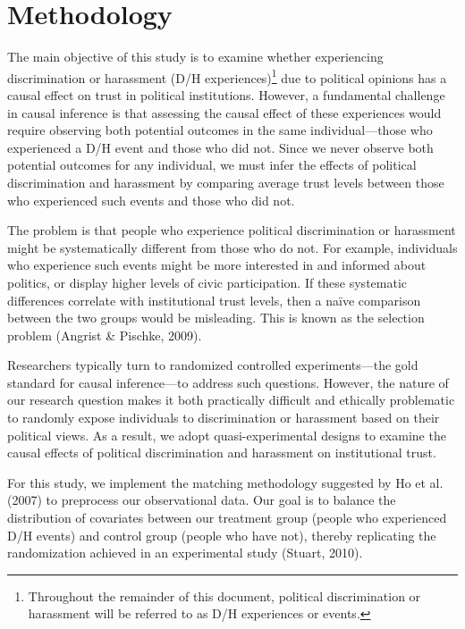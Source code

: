\documentclass{article}
\begin{document}


\section{Methodology}

The main objective of this study is to examine whether experiencing discrimination or harassment (D/H experiences)\footnote{Throughout the remainder of this document, political discrimination or harassment will be referred to as D/H experiences or events.} due to political opinions has a causal effect on trust in political institutions. However, a fundamental challenge in causal inference is that assessing the causal effect of these experiences would require observing both potential outcomes in the same individual—those who experienced a D/H event and those who did not. Since we never observe both potential outcomes for any individual, we must infer the effects of political discrimination and harassment by comparing average trust levels between those who experienced such events and those who did not.

The problem is that people who experience political discrimination or harassment might be systematically different from those who do not. For example, individuals who experience such events might be more interested in and informed about politics, or display higher levels of civic participation. If these systematic differences correlate with institutional trust levels, then a naïve comparison between the two groups would be misleading. This is known as the selection problem (Angrist \& Pischke, 2009).

Researchers typically turn to randomized controlled experiments—the gold standard for causal inference—to address such questions. However, the nature of our research question makes it both practically difficult and ethically problematic to randomly expose individuals to discrimination or harassment based on their political views. As a result, we adopt quasi-experimental designs to examine the causal effects of political discrimination and harassment on institutional trust.

For this study, we implement the matching methodology suggested by Ho et al. (2007) to preprocess our observational data. Our goal is to balance the distribution of covariates between our treatment group (people who experienced D/H events) and control group (people who have not), thereby replicating the randomization achieved in an experimental study (Stuart, 2010).
\end{document}

